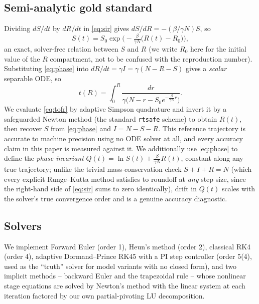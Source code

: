 \subsection{Semi-analytic gold standard}
Dividing $dS/dt$ by $dR/dt$ in \eqref{eq:sir} gives $dS/dR = -(\beta/\gamma N) S$, so
\begin{equation}
  S(t) = S_0 \exp\!\Big(-\tfrac{\beta}{\gamma N}\big(R(t)-R_0\big)\Big), \label{eq:phase}
\end{equation}
an exact, solver-free relation between $S$ and $R$ (we write $R_0$ here for the initial value of the
$R$ compartment, not to be confused with the reproduction number). Substituting \eqref{eq:phase} into
$dR/dt = \gamma I = \gamma(N-R-S)$ gives a \emph{scalar} separable ODE, so
\begin{equation}
  t(R) = \int_0^{R} \frac{dr}{\gamma\big(N - r - S_0 e^{-\frac{\beta}{\gamma N} r}\big)}. \label{eq:tofr}
\end{equation}
We evaluate \eqref{eq:tofr} by adaptive Simpson quadrature and invert it by a safeguarded
Newton method (the standard \texttt{rtsafe} scheme) to obtain $R(t)$, then recover $S$ from
\eqref{eq:phase} and $I = N-S-R$. This reference trajectory is accurate to machine precision using
no ODE solver at all, and every accuracy claim in this paper is measured against it. We additionally
use \eqref{eq:phase} to define the \emph{phase invariant}
$Q(t) = \ln S(t) + \frac{\beta}{\gamma N} R(t)$, constant along any true trajectory; unlike the
trivial mass-conservation check $S+I+R=N$ (which every explicit Runge--Kutta method satisfies to
roundoff at \emph{any} step size, since the right-hand side of \eqref{eq:sir} sums to zero
identically), drift in $Q(t)$ scales with the solver's true convergence order and is a genuine
accuracy diagnostic.

\subsection{Solvers}
We implement Forward Euler (order 1), Heun's method (order 2), classical RK4 (order 4), adaptive
Dormand--Prince RK45 with a PI step controller (order 5(4), used as the ``truth'' solver for model
variants with no closed form), and two implicit methods -- backward Euler and the trapezoidal rule
-- whose nonlinear stage equations are solved by Newton's method with the linear system at each
iteration factored by our own partial-pivoting LU decomposition.

